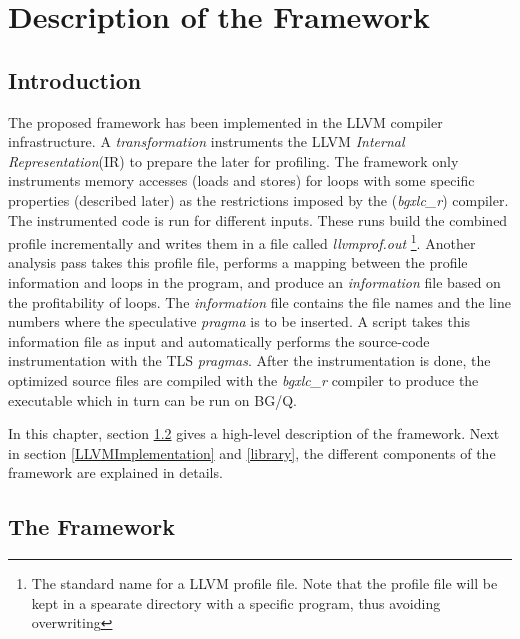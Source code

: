 \documentclass[10pt]{report}          %
\begin{document}
\chapter{Description of the Framework}

\section{Introduction}

The proposed framework has been implemented in the LLVM compiler infrastructure.  A \textit{transformation} instruments the LLVM \textit{Internal Representation}(IR) to prepare the later for profiling. The framework only instruments memory accesses (loads and stores) for loops with some specific properties (described later) as the restrictions imposed by the (\textit{bgxlc\_r}) compiler.  The instrumented code is run for different inputs.  These runs build the combined profile incrementally and writes them in a file called \textit{llvmprof.out} \footnote{The standard name for a LLVM profile file. Note that the profile file will be kept in a spearate directory with a specific program, thus avoiding overwriting}.  Another analysis pass takes this profile file, performs a mapping between the profile information and loops in the program, and produce an \textit{information} file based on the profitability of loops.  The \textit{information} file contains the file names and the line numbers where the speculative \textit{pragma} is to be inserted.  A script takes this information file as input and automatically performs the source-code instrumentation with the TLS \textit{pragmas}. After the instrumentation is done, the optimized source files are compiled with the \textit{bgxlc\_r} compiler to produce the executable which in turn can be run on BG/Q.

In this chapter, section \ref{framework} gives a high-level description of the framework.  Next in section \ref{LLVMImplementation} and \ref{library}, the different components of the framework are explained in details.

\section{The Framework}
\label{framework}
\end{document}
